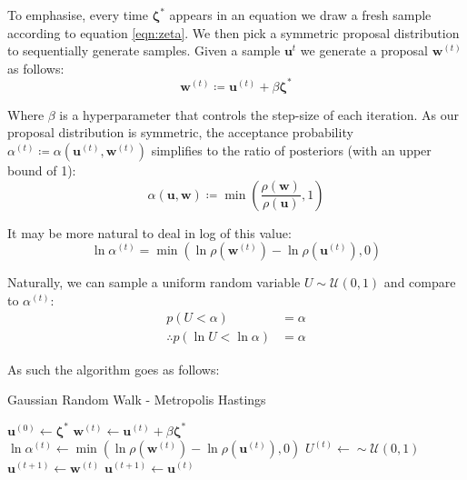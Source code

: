 \documentclass[]{article}
\newcommand{\ubold}{\boldsymbol{u}}
\newcommand{\wbold}{\boldsymbol{w}}
\newcommand{\zetabold}{\boldsymbol{\zeta^*}}
\begin{document}
To emphasise, every time $\zetabold$ appears in an equation we draw a fresh sample according to equation \ref{eqn:zeta}. We then pick a symmetric proposal distribution to sequentially generate samples. Given a sample $\ubold^{t}$ we generate a proposal $\wbold^{(t)}$ as follows:
%
\begin{equation}
	\wbold^{(t)} \coloneqq \ubold^{(t)} + \beta \zetabold
\end{equation}

Where $\beta$ is a hyperparameter that controls the step-size of each iteration. As our proposal distribution is symmetric, the acceptance probability $\alpha^{(t)} \coloneqq \alpha(\ubold^{(t)}, \wbold^{(t)})$ simplifies to the ratio of posteriors (with an upper bound of 1):
%
\begin{equation}
	\alpha(\ubold, \wbold) \coloneqq \min \left( \frac{\rho(\wbold)}{\rho(\ubold)}, 1 \right)
\end{equation}

It may be more natural to deal in log of this value:
%
\begin{equation}
	\ln \alpha^{(t)} = \min \left(\ln \rho(\wbold^{(t)}) - \ln \rho(\ubold^{(t)}), 0\right)
\end{equation}

Naturally, we can sample a uniform random variable $U \sim \mathcal{U}(0, 1)$ and compare to $\alpha^{(t)}$:
%
\begin{align}
	p(U < \alpha) &= \alpha \nonumber \\
	\therefore p(\ln U < \ln \alpha) &= \alpha
\end{align}

As such the algorithm goes as follows:
%
\begin{algorithm}
	\caption{Gaussian Random Walk - Metropolis Hastings}
	\label{alg:grw-mh}
\begin{algorithmic}
	\State $\ubold^{(0)} \gets \zetabold$
	\State $\wbold^{(t)} \gets \ubold^{(t)} + \beta \zetabold$ 
	\State $\ln \alpha^{(t)} \gets \min \left(\ln \rho(\wbold^{(t)}) - \ln \rho(\ubold^{(t)}), 0\right)$
	\State $U^{(t)} \gets \sim \mathcal{U}(0,1)$ \\
		\State $\ubold^{(t+1)} \gets \wbold^{(t)}$ 
	\Else
		\State $\ubold^{(t+1)} \gets \ubold^{(t)}$ 
	\EndIf
	\EndFor
\end{algorithmic}
\end{algorithm}
\end{document}
